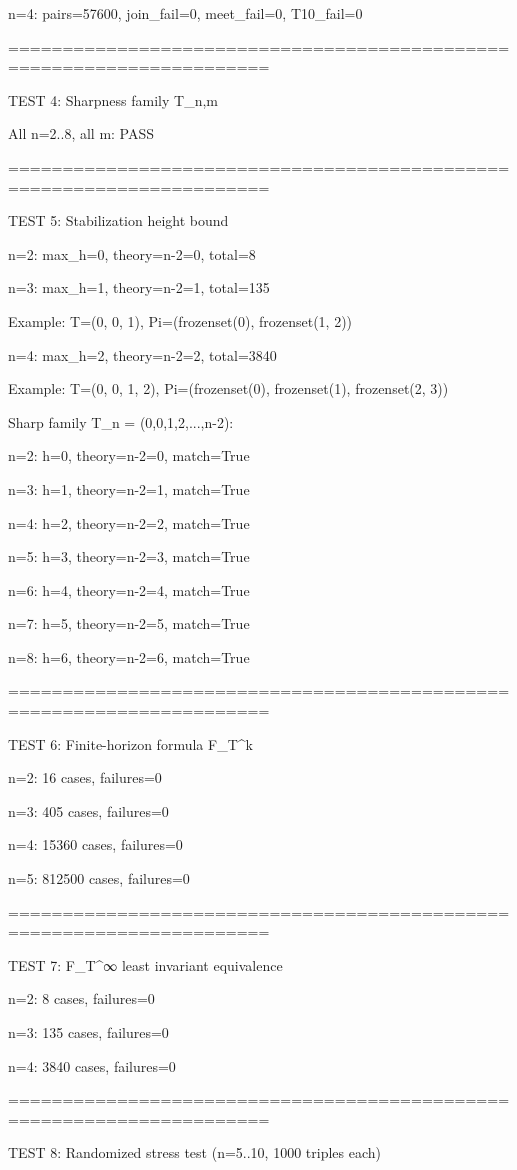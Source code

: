 n=4: pairs=57600, join_fail=0, meet_fail=0, T10_fail=0


======================================================================

TEST 4: Sharpness family T_{n,m}


All n=2..8, all m: PASS


======================================================================

TEST 5: Stabilization height bound


n=2: max_h=0, theory=n-2=0, total=8

n=3: max_h=1, theory=n-2=1, total=135

Example: T=(0, 0, 1), Pi=(frozenset({0}), frozenset({1, 2}))

n=4: max_h=2, theory=n-2=2, total=3840

Example: T=(0, 0, 1, 2), Pi=(frozenset({0}), frozenset({1}), frozenset({2, 3}))


Sharp family T_n = (0,0,1,2,...,n-2):

n=2: h=0, theory=n-2=0, match=True

n=3: h=1, theory=n-2=1, match=True

n=4: h=2, theory=n-2=2, match=True

n=5: h=3, theory=n-2=3, match=True

n=6: h=4, theory=n-2=4, match=True

n=7: h=5, theory=n-2=5, match=True

n=8: h=6, theory=n-2=6, match=True


======================================================================

TEST 6: Finite-horizon formula F_T^k


n=2: 16 cases, failures=0

n=3: 405 cases, failures=0

n=4: 15360 cases, failures=0

n=5: 812500 cases, failures=0


======================================================================

TEST 7: F_T^∞ least invariant equivalence


n=2: 8 cases, failures=0

n=3: 135 cases, failures=0

n=4: 3840 cases, failures=0


======================================================================

TEST 8: Randomized stress test (n=5..10, 1000 triples each)


